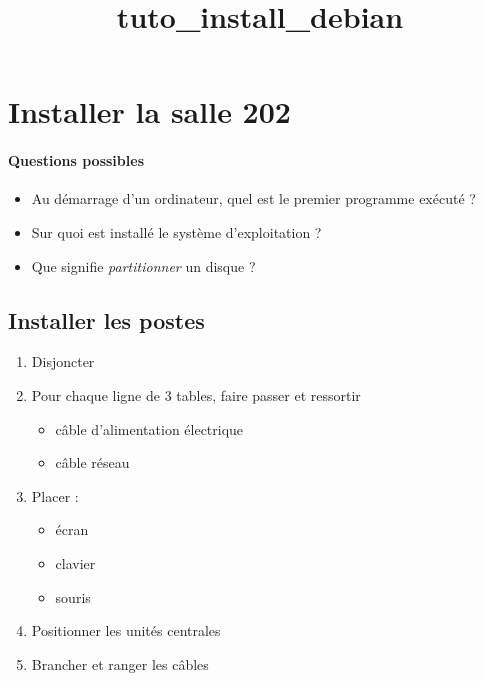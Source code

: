 \documentclass[11pt]{article}
\title{tuto\_install\_debian}
\providecommand{\tightlist}{%
      \setlength{\itemsep}{0pt}\setlength{\parskip}{0pt}}
\begin{document}
    
    \maketitle
    
    

    
    \hypertarget{installer-la-salle-202}{%
\section{Installer la salle 202}\label{installer-la-salle-202}}

    \hypertarget{questions-possibles}{%
\paragraph{Questions possibles}\label{questions-possibles}}

\begin{itemize}
\tightlist
\item
  Au démarrage d'un ordinateur, quel est le premier programme exécuté ?
\item
  Sur quoi est installé le système d'exploitation ?
\item
  Que signifie \emph{partitionner} un disque ?
\end{itemize}

    \hypertarget{installer-les-postes}{%
\subsection{Installer les postes}\label{installer-les-postes}}

    \begin{enumerate}
\def\labelenumi{\arabic{enumi}.}
\tightlist
\item
  Disjoncter
\item
  Pour chaque ligne de 3 tables, faire passer et ressortir

  \begin{itemize}
  \tightlist
  \item
    câble d'alimentation électrique
  \item
    câble réseau
  \end{itemize}
\item
  Placer :

  \begin{itemize}
  \tightlist
  \item
    écran
  \item
    clavier
  \item
    souris
  \end{itemize}
\item
  Positionner les unités centrales
\item
  Brancher et ranger les câbles
\end{enumerate}
\end{document}
